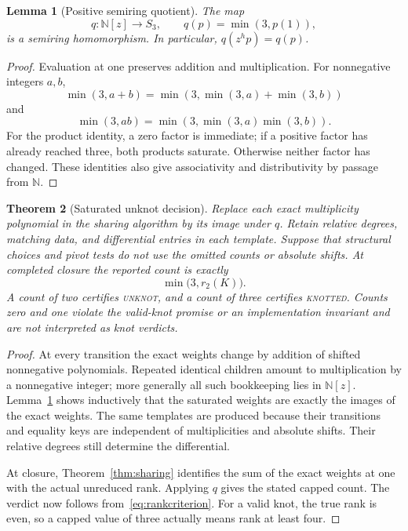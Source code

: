 \documentclass[11pt,letterpaper]{article}
\newtheorem{theorem}{Theorem}[section]
\newtheorem{lemma}[theorem]{Lemma}
\newcommand{\N}{\mathbb N}
\newcommand{\UNKNOT}{\textup{\textsc{unknot}}}
\newcommand{\KNOTTED}{\textup{\textsc{knotted}}}
\begin{document}
\begin{lemma}[Positive semiring quotient]\label{lem:semiring}
The map
\[
 q:\N[z]\longrightarrow S_3,\qquad q(p)=\min(3,p(1)),
\]
is a semiring homomorphism. In particular, $q(z^h p)=q(p)$.
\end{lemma}
\begin{proof}
Evaluation at one preserves addition and multiplication. For nonnegative
integers $a,b$,
\[
 \min(3,a+b)=\min(3,\min(3,a)+\min(3,b))
\]
and
\[
 \min(3,ab)=\min(3,\min(3,a)\min(3,b)).
\]
For the product identity, a zero factor is immediate; if a positive factor
has already reached three, both products saturate. Otherwise neither
factor has changed. These identities also give associativity and
distributivity by passage from $\N$.
\end{proof}

\begin{theorem}[Saturated unknot decision]\label{thm:saturation}
Replace each exact multiplicity polynomial in the sharing algorithm by its
image under $q$. Retain relative degrees, matching data, and differential
entries in each template. Suppose that structural choices and pivot tests
do not use the omitted counts or absolute shifts. At completed closure the
reported count is exactly
\[
 \min\bigl(3,r_2(K)\bigr).
\]
A count of two certifies \UNKNOT, and a count of three certifies \KNOTTED.
Counts zero and one violate the valid-knot promise or an implementation
invariant and are not interpreted as knot verdicts.
\end{theorem}
\begin{proof}
At every transition the exact weights change by addition of shifted
nonnegative polynomials. Repeated identical children amount to
multiplication by a nonnegative integer; more generally all such
bookkeeping lies in $\N[z]$. Lemma~\ref{lem:semiring} shows inductively
that the saturated weights are exactly the images of the exact weights.
The same templates are produced because their transitions and equality keys
are independent of multiplicities and absolute shifts. Their relative
degrees still determine the differential.

At closure, Theorem~\ref{thm:sharing} identifies the sum of the exact
weights at one with the actual unreduced rank. Applying $q$ gives the stated
capped count. The verdict now follows from~\eqref{eq:rankcriterion}. For a
valid knot, the true rank is even, so a capped value of three actually means
rank at least four.
\end{proof}
\end{document}
